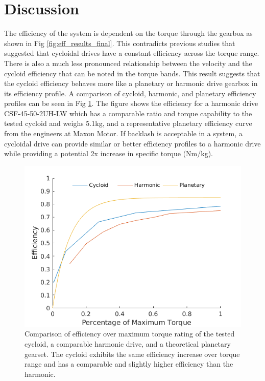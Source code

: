 \section{Discussion} \label{ch:single:discussion}

The efficiency of the system is dependent on the torque through the gearbox as shown in Fig \ref{fig:eff_results_final}.
This contradicts previous studies that suggested that cycloidal drives have a constant efficiency across the torque range.
There is also a much less pronounced relationship between the velocity and the cycloid efficiency that can be noted in the torque bands.
This result suggests that the cycloid efficiency behaves more like a planetary or harmonic drive gearbox in its efficiency profile.
A comparison of cycloid, harmonic, and planetary efficiency profiles can be seen in Fig \ref{fig:eff_comp}.
The figure shows the efficiency for a harmonic drive CSF-45-50-2UH-LW \cite{ref:harmonic_sheet} which has a comparable ratio and torque capability to the tested cycloid and weighs 5.1kg, and a representative planetary efficiency curve from the engineers at Maxon Motor.
If backlash is acceptable in a system, a cycloidal drive can provide similar or better efficiency profiles to a harmonic drive while providing a potential 2x increase in specific torque (Nm/kg).

\begin{figure}[h]
   \centering
   \includegraphics[width=0.7\linewidth]{fig/eff_comp_v3}
   \caption{Comparison of efficiency over maximum torque rating of the tested cycloid, a comparable harmonic drive, and a theoretical planetary gearset.
   The cycloid exhibits the same efficiency increase over torque range and has a comparable and slightly higher efficiency than the harmonic.}
   \label{fig:eff_comp}
\end{figure}

